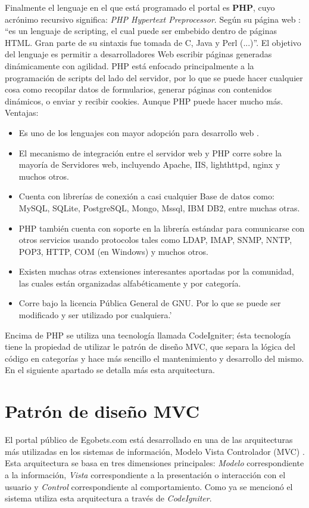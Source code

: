 Finalmente el lenguaje en el que está programado el portal es \textbf{PHP}, cuyo acrónimo recursivo significa: \emph{PHP Hypertext Preprocessor}. Según su página web \cite{phpWeb}: ``es un lenguaje de scripting, el cual puede ser embebido dentro de páginas HTML. Gran parte de su sintaxis fue tomada de C, Java y Perl (...)''. El objetivo del lenguaje es permitir a desarrolladores Web escribir páginas generadas dinámicamente con agilidad.
PHP está enfocado principalmente a la programación de scripts del lado del servidor, por lo que se puede hacer cualquier cosa como recopilar datos de formularios, generar páginas con contenidos dinámicos, o enviar y recibir cookies. Aunque PHP puede hacer mucho más.
				 Ventajas:
	\begin{itemize}
		\item Es uno de los lenguajes con mayor adopción para desarrollo web \cite{tiobeIndex}.
		\item El mecanismo de integración entre el servidor web y PHP corre sobre la mayoría de Servidores web, incluyendo Apache, IIS, lighthttpd, nginx y muchos otros.
		\item Cuenta con librerías de conexión a casi cualquier Base de datos como: MySQL, SQLite, PostgreSQL, Mongo, Mssql, IBM DB2, entre muchas otras.
		\item PHP también cuenta con soporte en la librería estándar para comunicarse con otros servicios usando protocolos tales como LDAP, IMAP, SNMP, NNTP, POP3, HTTP, COM (en Windows) y muchos otros.
		\item Existen muchas otras extensiones interesantes aportadas por la comunidad, las cuales están organizadas alfabéticamente y por categoría.
		\item Corre bajo la licencia Pública General de GNU. Por lo que se puede ser modificado y ser utilizado por cualquiera.'
	\end{itemize}

Encima de PHP se utiliza una tecnología llamada CodeIgniter; ésta tecnología tiene la propiedad de utilizar le patrón de diseño MVC, que separa la lógica del código en categorías y hace más sencillo el mantenimiento y desarrollo del mismo. En el siguiente apartado se detalla más esta arquitectura.

\section{Patrón de diseño MVC}

El portal público de Egobets.com está desarrollado en una de las arquitecturas más utilizadas en los sistemas de información, Modelo Vista Controlador (MVC) \cite{alfredo2005ingenieria}. Esta arquitectura se basa en tres dimensiones principales: \emph{Modelo} correspondiente a la información, \emph{Vista} correspondiente a la presentación o interacción con el usuario y \emph{Control} correspondiente al comportamiento. Como ya se mencionó el sistema utiliza esta arquitectura a través de \emph{CodeIgniter}.

